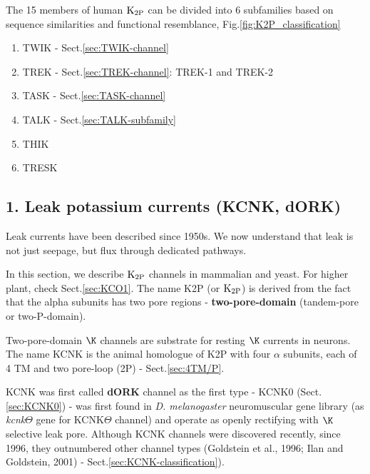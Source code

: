 The 15 members of human ${\text{K}_{\text{2P}}}$ can be divided into 6 subfamilies based on
sequence similarities and functional resemblance, Fig.\ref{fig:K2P_classification}
\begin{enumerate}
  \item TWIK - Sect.\ref{sec:TWIK-channel}
  
  \item TREK - Sect.\ref{sec:TREK-channel}: TREK-1 and TREK-2
  
  \item TASK - Sect.\ref{sec:TASK-channel}
  
  \item TALK - Sect.\ref{sec:TALK-subfamily}
  
  \item THIK
  
  \item TRESK
\end{enumerate}

\subsection{1. Leak potassium currents (KCNK, dORK)}
\label{sec:leak-K+-current}
\label{sec:K_leak-current}
\label{sec:dORK}
\label{sec:KCNK}

Leak currents have been described since 1950s.
We now understand that leak is not just seepage, but flux through dedicated
pathways.

In this section, we describe ${\text{K}_{\text{2P}}}$ channels in mammalian and yeast. For
higher plant, check Sect.\ref{sec:KCO1}.
The name K2P (or ${\text{K}_{\text{2P}}}$) is derived from the fact that the alpha subunits has
two pore regions - {\bf two-pore-domain} (tandem-pore or two-P-domain).

Two-pore-domain $\K$ channels are substrate for resting $\K$ currents in
neurons. The name KCNK is the animal homologue of K2P with four $\alpha$
subunits, each  of 4 TM and two pore-loop (2P) - Sect.\ref{sec:4TM/P}.

KCNK was first called {\bf dORK} channel as the first type - KCNK0
(Sect.\ref{sec:KCNK0}) - was first found in {\it D. melanogaster} neuromuscular
gene library (as {\it kcnk}$\Theta$ gene for KCNK$\Theta$ channel) and operate
as openly rectifying with $\K$ selective leak pore. Although KCNK channels were
discovered recently, since 1996, they outnumbered other channel types (Goldstein
et al., 1996; Ilan and Goldstein, 2001) - Sect.\ref{sec:KCNK-classification}).

